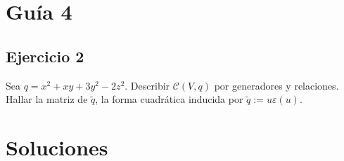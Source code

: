 \documentclass[12pt]{amsart}
\newcommand{\lp}{\left(}
\newcommand{\rp}{\right)}
\theoremstyle{plain}
\begin{document}
\section*{Guía 4}


\subsection*{Ejercicio 2} Sea $q=x^2+xy+3y^2-2z^2$. Describir 
$\mathcal{C}(V,q)$ por generadores y relaciones. Hallar la matriz 
de $\tilde{q}$, la forma cuadrática inducida por $\tilde{q}:=u
\varepsilon (u)$.




\newpage

\section*{Soluciones}






\end{document}
